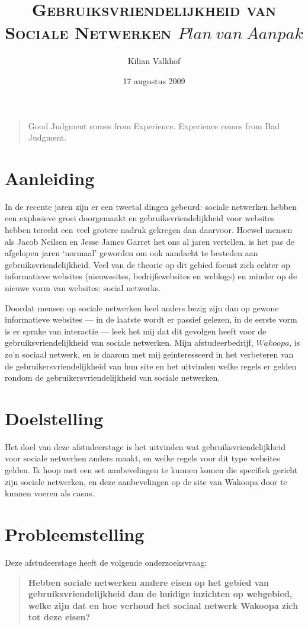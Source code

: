\documentclass[a4paper, 10pt, twoside, pdftex]{article}
\title{\textsc{Gebruiksvriendelijkheid van Sociale Netwerken} \linebreak $Plan~van~Aanpak$}
\author{Kilian Valkhof}
\date{17 augustus 2009}
\begin{document}
\maketitle

\begin{quote}
Good Judgment comes from Experience. Experience comes from Bad Judgment. 
\end{quote}
\newpage 
\tableofcontents

\newpage
\section{Aanleiding}
In de recente jaren zijn er een tweetal dingen gebeurd: sociale netwerken hebben een explosieve groei doorgemaakt 
en gebruiksvriendelijkheid voor websites hebben terecht een veel grotere nadruk gekregen dan daarvoor. Hoewel mensen 
als Jacob Neilsen en Jesse James Garret het ons al jaren vertellen, is het pas de afgelopen jaren `normaal' geworden
om ook aandacht te besteden aan gebruiksvriendelijkheid. Veel van de theorie op dit gebied focust zich echter op 
informatieve websites (nieuwssites, bedrijfswebsites en weblogs) en minder op de nieuwe vorm van websites: social networks.

Doordat mensen op sociale netwerken heel anders bezig zijn dan op gewone informatieve websites --- in de laatste wordt er 
passief gelezen, in de eerste vorm is er sprake van interactie --- leek het mij dat dit gevolgen heeft voor de gebruiksvriendelijkheid
van sociale netwerken. Mijn afstudeerbedrijf, $Wakoopa$, is zo'n sociaal netwerk, en is daarom met mij geinteresseerd in het verbeteren
van de gebruikersvriendelijkheid van hun site en het uitvinden welke regels er gelden rondom de gebruikersvriendelijkheid van sociale netwerken.


\section{Doelstelling}
Het doel van deze afstudeerstage is het uitvinden wat gebruiksvriendelijkheid voor sociale netwerken anders maakt, en welke regels voor dit type websites gelden. 
Ik hoop met een set aanbevelingen te kunnen komen die specifiek gericht zijn sociale netwerken, en deze aanbevelingen op de site van Wakoopa door te kunnen voeren als casus.


\section{Probleemstelling}
Deze afstudeerstage heeft de volgende onderzoeksvraag:
\begin{quote}
 \textbf{Hebben sociale netwerken andere eisen op het gebied van gebruiksvriendelijkheid dan de huidige inzichten op webgebied, welke zijn dat en hoe verhoud het sociaal netwerk Wakoopa zich tot deze eisen?}
\end{quote}
\end{document}
